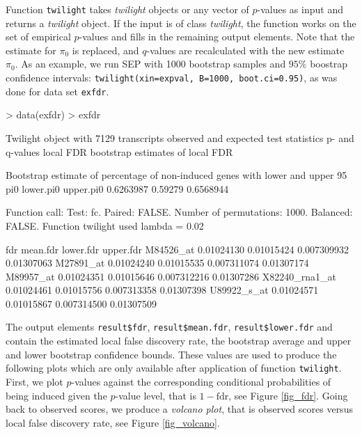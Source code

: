 \documentclass[11pt,a4paper,fleqn]{report}
\newcommand{\Robject}[1]{{\texttt{#1}}}
\newcommand{\Rfunction}[1]{{\texttt{#1}}}
\newcommand{\Rclass}[1]{{\textit{#1}}}
\begin{document}
Function \Rfunction{twilight} takes \Rclass{twilight} objects or any vector of $p$-values as input and returns a \Rclass{twilight} object. If the input is of class \Rclass{twilight}, the function works on the set of empirical $p$-values and fills in the remaining output elements. Note that the estimate for $\pi_0$ is replaced, and $q$-values are recalculated with the new estimate $\pi_0$.
As an example, we run SEP with 1000 bootstrap samples and $95\%$ boostrap confidence intervals: \Rfunction{twilight(xin=expval, B=1000, boot.ci=0.95)}, as was done for data set \Robject{exfdr}.
\begin{Schunk}
\begin{Sinput}
> data(exfdr)
> exfdr
\end{Sinput}
\begin{Soutput}
 Twilight object with
     7129 transcripts
     observed and expected test statistics
     p- and q-values
     local FDR
     bootstrap estimates of local FDR

 Bootstrap estimate of percentage of non-induced
 genes with lower and upper 95% CI:
       pi0 lower.pi0 upper.pi0
 0.6263987   0.59279 0.6568944

 Function call:
 Test: fc. Paired: FALSE. Number of permutations: 1000. Balanced: FALSE. 
 Function twilight used lambda = 0.02 
\end{Soutput}
\end{Schunk}
\begin{Schunk}
\begin{Soutput}
                      fdr   mean.fdr   lower.fdr  upper.fdr
M84526_at      0.01024130 0.01015424 0.007309932 0.01307063
M27891_at      0.01024240 0.01015535 0.007311074 0.01307174
M89957_at      0.01024351 0.01015646 0.007312216 0.01307286
X82240_rna1_at 0.01024461 0.01015756 0.007313358 0.01307398
U89922_s_at    0.01024571 0.01015867 0.007314500 0.01307509
\end{Soutput}
\end{Schunk}

The output elements \Robject{result\$fdr}, \Robject{result\$mean.fdr}, \Robject{result\$lower.fdr} and \linebreak[5] \Robject{result\$upper.fdr} contain the estimated local false discovery rate, the bootstrap average and upper and lower bootstrap confidence bounds. These values are used to produce the following plots which are only available after application of function \Rfunction{twilight}. First, we plot $p$-values against the corresponding conditional probabilities of being induced given the $p$-value level, that is $1-\mbox{fdr}$, see Figure \ref{fig_fdr}. Going back to observed scores, we produce a \textit{volcano plot}, that is observed scores versus local false discovery rate, see Figure \ref{fig_volcano}.
\end{document}
